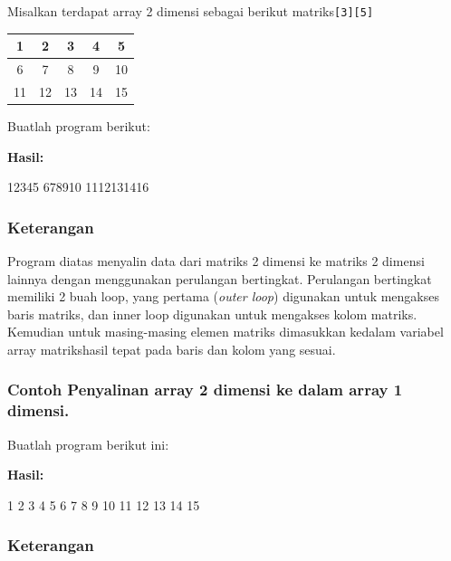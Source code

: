 Misalkan terdapat array 2 dimensi sebagai berikut
matriks\texttt{{[}3{]}{[}5{]}}

\begin{tabular}{|c|c|c|c|c|}
\hline
1 & 2 & 3 & 4 & 5 \\ \hline
6 & 7 & 8 & 9 & 10 \\ \hline
11 & 12 & 13 & 14 & 15 \\ \hline

\end{tabular}

Buatlah program berikut:



\textbf{Hasil:}

\begin{lcverbatim}
12345
678910
1112131416
\end{lcverbatim}

\subsubsection*{Keterangan}

Program diatas menyalin data dari matriks 2 dimensi ke matriks 2 dimensi
lainnya dengan menggunakan perulangan bertingkat. Perulangan bertingkat
memiliki 2 buah loop, yang pertama (\emph{outer loop}) digunakan untuk
mengakses baris matriks, dan inner loop digunakan untuk mengakses kolom
matriks. Kemudian untuk masing-masing elemen matriks dimasukkan kedalam
variabel array matrikshasil tepat pada baris dan kolom yang sesuai.

\subsubsection*{Contoh Penyalinan array 2 dimensi ke dalam array 1 dimensi.}

Buatlah program berikut ini:



\textbf{Hasil:}

\begin{lcverbatim}
1
2
3
4
5
6
7
8
9
10
11
12
13
14
15
\end{lcverbatim}

\subsubsection*{Keterangan}

